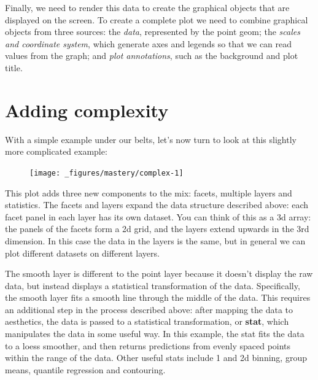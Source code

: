 Finally, we need to render this data to create the graphical objects
that are displayed on the screen. To create a complete plot we need to
combine graphical objects from three sources: the \emph{data},
represented by the point geom; the \emph{scales and coordinate system},
which generate axes and legends so that we can read values from the
graph; and \emph{plot annotations}, such as the background and plot
title.

\hypertarget{sec:complex-plot}{\section{Adding
complexity}\label{sec:complex-plot}}

With a simple example under our belts, let's now turn to look at this
slightly more complicated example:

\begin{Shaded}
\begin{Highlighting}[]
\StringTok{ }
\StringTok{  }\NormalTok{() +}
\StringTok{  }\NormalTok{() +}\StringTok{ }
\StringTok{  }
\end{Highlighting}
\end{Shaded}

\begin{figure}[H]
  \centering
  \texttt{[image: \_figures/mastery/complex-1]}
\end{figure}

This plot adds three new components to the mix: facets, multiple layers
and statistics. The facets and layers expand the data structure
described above: each facet panel in each layer has its own dataset. You
can think of this as a 3d array: the panels of the facets form a 2d
grid, and the layers extend upwards in the 3rd dimension. In this case
the data in the layers is the same, but in general we can plot different
datasets on different layers.

The smooth layer is different to the point layer because it doesn't
display the raw data, but instead displays a statistical transformation
of the data. Specifically, the smooth layer fits a smooth line through
the middle of the data. This requires an additional step in the process
described above: after mapping the data to aesthetics, the data is
passed to a statistical transformation, or \textbf{stat}, which
manipulates the data in some useful way. In this example, the stat fits
the data to a loess smoother, and then returns predictions from evenly
spaced points within the range of the data. Other useful stats include 1
and 2d binning, group means, quantile regression and contouring.

